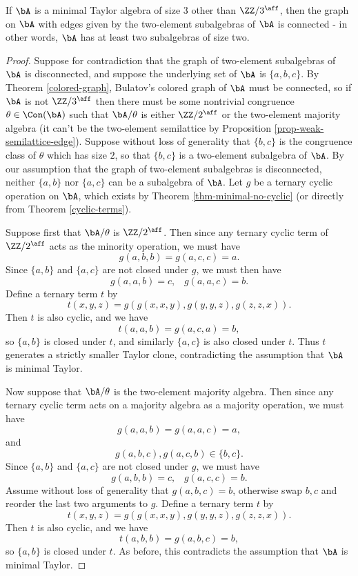 \begin{prop} If $\bA$ is a minimal Taylor algebra of size $3$ other than $\ZZ/3^{\aff}$, then the graph on $\bA$ with edges given by the two-element subalgebras of $\bA$ is connected - in other words, $\bA$ has at least two subalgebras of size two.
\end{prop}
\begin{proof} Suppose for contradiction that the graph of two-element subalgebras of $\bA$ is disconnected, and suppose the underlying set of $\bA$ is $\{a,b,c\}$. By Theorem \ref{colored-graph}, Bulatov's colored graph of $\bA$ must be connected, so if $\bA$ is not $\ZZ/3^{\aff}$ then there must be some nontrivial congruence $\theta \in \Con(\bA)$ such that $\bA/\theta$ is either $\ZZ/2^{\aff}$ or the two-element majority algebra (it can't be the two-element semilattice by Proposition \ref{prop-weak-semilattice-edge}). Suppose without loss of generality that $\{b,c\}$ is the congruence class of $\theta$ which has size $2$, so that $\{b,c\}$ is a two-element subalgebra of $\bA$. By our assumption that the graph of two-element subalgebras is disconnected, neither $\{a,b\}$ nor $\{a,c\}$ can be a subalgebra of $\bA$. Let $g$ be a ternary cyclic operation on $\bA$, which exists by Theorem \ref{thm-minimal-no-cyclic} (or directly from Theorem \ref{cyclic-terms}).

Suppose first that $\bA/\theta$ is $\ZZ/2^{\aff}$. Then since any ternary cyclic term of $\ZZ/2^{\aff}$ acts as the minority operation, we must have
\[
g(a,b,b) = g(a,c,c) = a.
\]
Since $\{a,b\}$ and $\{a,c\}$ are not closed under $g$, we must then have
\[
g(a,a,b) = c, \;\;\; g(a,a,c) = b.
\]
Define a ternary term $t$ by
\[
t(x,y,z) = g(g(x,x,y), g(y,y,z), g(z,z,x)).
\]
Then $t$ is also cyclic, and we have
\[
t(a,a,b) = g(a,c,a) = b,
\]
so $\{a,b\}$ is closed under $t$, and similarly $\{a,c\}$ is also closed under $t$. Thus $t$ generates a strictly smaller Taylor clone, contradicting the assumption that $\bA$ is minimal Taylor.

Now suppose that $\bA/\theta$ is the two-element majority algebra. Then since any ternary cyclic term acts on a majority algebra as a majority operation, we must have
\[
g(a,a,b) = g(a,a,c) = a,
\]
and
\[
g(a,b,c), g(a,c,b) \in \{b,c\}.
\]
Since $\{a,b\}$ and $\{a,c\}$ are not closed under $g$, we must have
\[
g(a,b,b) = c, \;\;\; g(a,c,c) = b.
\]
Assume without loss of generality that $g(a,b,c) = b$, otherwise swap $b,c$ and reorder the last two arguments to $g$. Define a ternary term $t$ by
\[
t(x,y,z) = g(g(x,x,y), g(y,y,z), g(z,z,x)).
\]
Then $t$ is also cyclic, and we have
\[
t(a,b,b) = g(a,b,c) = b,
\]
so $\{a,b\}$ is closed under $t$. As before, this contradicts the assumption that $\bA$ is minimal Taylor.
\end{proof}

